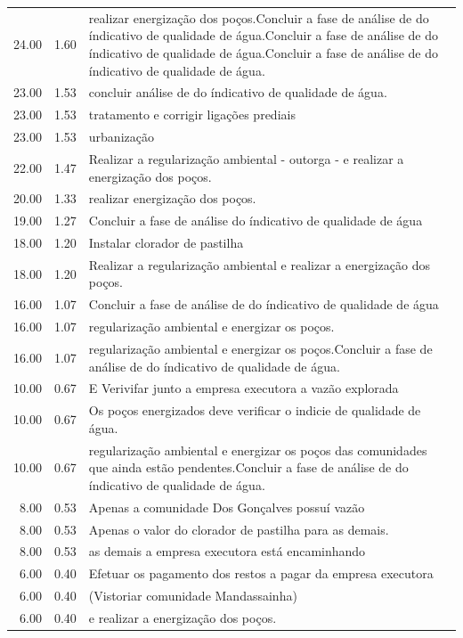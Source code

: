 \documentclass[a4paper, 12pt, openright, oneside, english, brazil, article]{abntex2}
\begin{document}
\begin{scriptsize}
\begin{longtable}{rrp{11cm}}
			24.00 & 1.60 & realizar energização dos poços.Concluir a fase de análise de do índicativo de qualidade de água.Concluir a fase de análise de do índicativo de qualidade de água.Concluir a fase de análise de do índicativo de qualidade de água. \\ 
			23.00 & 1.53 & concluir análise de do índicativo de qualidade de água. \\ 
			23.00 & 1.53 & tratamento e corrigir ligações prediais \\ 
			23.00 & 1.53 & urbanização \\ 
			22.00 & 1.47 & Realizar a regularização ambiental -  outorga -  e realizar a energização dos poços. \\ 
			20.00 & 1.33 & realizar energização dos poços. \\ 
			19.00 & 1.27 & Concluir a fase de análise do índicativo de qualidade de água \\ 
			18.00 & 1.20 &  Instalar clorador de pastilha \\ 
			18.00 & 1.20 & Realizar a regularização ambiental e realizar a energização dos poços. \\ 
			16.00 & 1.07 & Concluir a fase de análise de do índicativo de qualidade de água \\ 
			16.00 & 1.07 & regularização ambiental e energizar os poços. \\ 
			16.00 & 1.07 & regularização ambiental e energizar os poços.Concluir a fase de análise de do índicativo de qualidade de água. \\ 
			10.00 & 0.67 & E Verivifar junto a empresa executora a vazão explorada \\ 
			10.00 & 0.67 & Os poços energizados deve verificar o indicie de qualidade de água. \\ 
			10.00 & 0.67 & regularização ambiental e energizar os poços das comunidades que ainda estão pendentes.Concluir a fase de análise de do índicativo de qualidade de água. \\ 
			8.00 & 0.53 & Apenas a comunidade Dos Gonçalves possuí vazão \\ 
			8.00 & 0.53 & Apenas o valor do clorador de pastilha para as demais. \\ 
			8.00 & 0.53 & as demais a empresa executora está encaminhando \\ 
			6.00 & 0.40 &  Efetuar os pagamento dos restos a pagar da empresa executora \\ 
			6.00 & 0.40 & (Vistoriar comunidade Mandassainha) \\ 
			6.00 & 0.40 & e realizar a energização dos poços. \\ 

\end{longtable}
\end{scriptsize}
\end{document}

